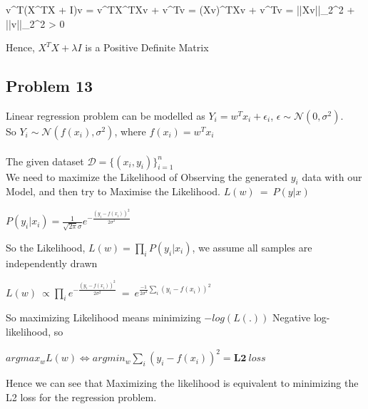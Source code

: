 \documentclass[12pt]{article}
\begin{document}
        v^T(X^TX + \lambda I)v   = v^TX^TXv + \lambda v^Tv = (Xv)^TXv + \lambda v^Tv = ||Xv||_2^2 + \lambda||v||_2^2 > 0
        
Hence, $X^TX + \lambda I$ is a Positive Definite Matrix

\vspace{0.5em}

\vspace{1em}



\subsection{Problem 13}
\vspace{0.5em}

Linear regression problem can be modelled as $Y_i = w^Tx_i + \epsilon_i$, $\epsilon \sim \mathcal{N}(0,\sigma^{2}) $.\\
So $Y_i \sim \mathcal{N}(f(x_i),\sigma^2)$, where $f(x_i) = w^Tx_i$
\\
\\
The given dataset $\mathcal{D} = \{(x_i,y_i)\}_{i=1}^n$ \\



We need to maximize the Likelihood of Observing the generated $y_i$ data with our Model, and then try to Maximise the Likelihood. $L(w)\ = \ P(y|x)$

\begin{center}
$P(y_i|x_i) = \frac{1}{\sqrt{2\pi}\sigma}e^{-\frac{(y_i - f(x_i))^2}{2\sigma^2}}$
\end{center}

So the Likelihood, $L(w) = \prod_i P(y_i|x_i)$, we assume all samples are independently drawn
\begin{center}
$L(w)\ \propto \prod_i e^{-\frac{(y_i - f(x_i))^2}{2\sigma^2}}\ = \ e^{\frac{-1}{2\sigma^2}\sum_i (y_i - f(x_i))^2}$
\end{center}

So maximizing Likelihood means minimizing $-log(L(.))$ Negative log-likelihood, so
\begin{center}
    $argmax_w L(w) \iff argmin_w \sum_i (y_i - f(x_i))^2= \mathbf{L2}\ loss$ 
\end{center}

Hence we can see that Maximizing the likelihood is equivalent to minimizing the L2 loss for the regression problem.

\vspace{0.5em}



\newpage



\end{document}
